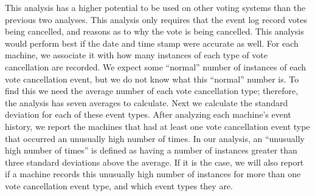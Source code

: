 This analysis has a higher potential to be used on other voting systems than the previous two analyses.  This analysis only requires that the event log record votes being cancelled, and reasons as to why the vote is being cancelled.  This analysis would perform best if the date and time stamp were accurate as well.  For each machine, we associate it with how many instances of each type of vote cancellation are recorded.  We expect some \textquotedblleft normal\textquotedblright \hspace{1 mm} number of instances of each vote cancellation event, but we do not know what this \textquotedblleft normal\textquotedblright \hspace{1 mm} number is.  To find this we need the average number of each vote cancellation type; therefore, the analysis has seven averages to calculate.  Next we calculate the standard deviation for each of these event types.  After analyzing each machine's event history, we report the machines that had at least one vote cancellation event type that occurred an unusually high number of times. In our analysis, an \textquotedblleft unusually high number of times\textquotedblright \hspace{1 mm} is defined as having a number of instances greater than three standard deviations above the average.  If it is the case, we will also report if a machine records this unusually high number of instances for more than one vote cancellation event type, and which event types they are.  

